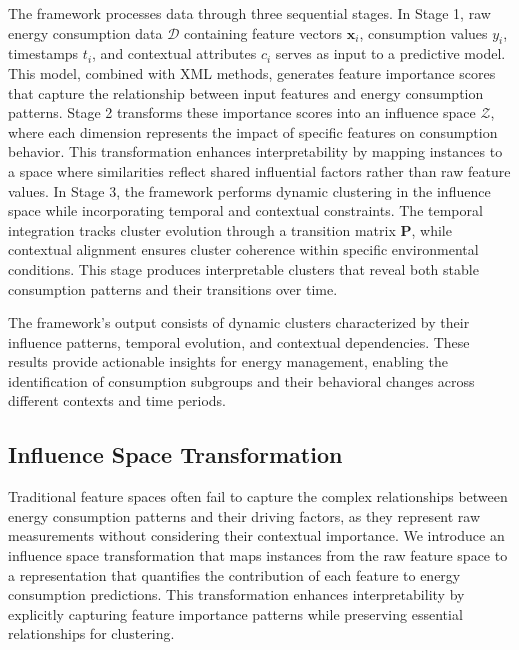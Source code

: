 \documentclass[final,5p,times,twocolumn,numbers]{elsarticle}
\begin{document}
The framework processes data through three sequential stages. In Stage 1, raw energy consumption data $\mathcal{D}$ containing feature vectors $\mathbf{x}_i$, consumption values $y_i$, timestamps $t_i$, and contextual attributes $c_i$ serves as input to a predictive model. This model, combined with XML methods, generates feature importance scores that capture the relationship between input features and energy consumption patterns.
Stage 2 transforms these importance scores into an influence space $\mathcal{Z}$, where each dimension represents the impact of specific features on consumption behavior. This transformation enhances interpretability by mapping instances to a space where similarities reflect shared influential factors rather than raw feature values.
In Stage 3, the framework performs dynamic clustering in the influence space while incorporating temporal and contextual constraints. The temporal integration tracks cluster evolution through a transition matrix $\mathbf{P}$, while contextual alignment ensures cluster coherence within specific environmental conditions. This stage produces interpretable clusters that reveal both stable consumption patterns and their transitions over time.

The framework's output consists of dynamic clusters characterized by their influence patterns, temporal evolution, and contextual dependencies. These results provide actionable insights for energy management, enabling the identification of consumption subgroups and their behavioral changes across different contexts and time periods.

\subsection{Influence Space Transformation}
Traditional feature spaces often fail to capture the complex relationships between energy consumption patterns and their driving factors, as they represent raw measurements without considering their contextual importance. We introduce an influence space transformation that maps instances from the raw feature space to a representation that quantifies the contribution of each feature to energy consumption predictions. This transformation enhances interpretability by explicitly capturing feature importance patterns while preserving essential relationships for clustering.
\end{document}
